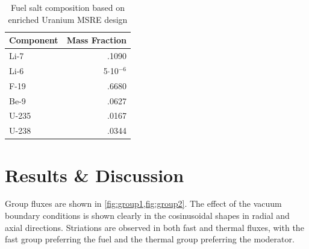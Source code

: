 \documentclass{article}
\let\Oldsection\section
\renewcommand{\section}{\FloatBarrier\Oldsection}
\begin{document}
\begin{table}[htpb]
  \begin{center}
    \begin{tabular}{l | r}
      Component & Mass Fraction\\\hline\hline
      Li-7 & .1090\\
      Li-6 & 5$\cdot$10$^{-6}$\\
      F-19 & .6680\\
      Be-9 & .0627\\
      U-235 & .0167\\
      U-238 & .0344\\
    \end{tabular}
  \end{center}
  \caption{Fuel salt composition based on enriched Uranium \gls{MSRE} design \cite{robertson_msre_1965}}
  \label{table:comp}
\end{table}


\section{Results \& Discussion}

Group fluxes are shown in \cref{fig:group1,fig:group2}. The effect of the vacuum
boundary conditions is shown clearly in the cosinusoidal shapes in radial and
axial directions. Striations are observed in both fast and thermal fluxes, with
the fast group preferring the fuel and the thermal group preferring the moderator.
\end{document}
